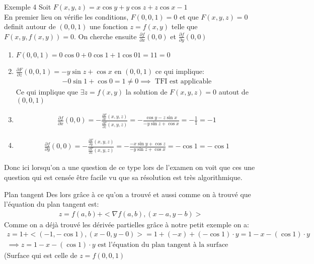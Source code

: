 \begin{parag}{Exemple 4}
    Soit $F\left(x, y, z\right) = x\cos y + y \cos z + z \cos x -1$\\
    En premier lieu on vérifie les conditions, $F\left(0, 0, 1\right) = 0$ et que $F\left(x, y, z\right) = 0$ definit autour de $\left(0, 0, 1\right)$ une fonction $z = f\left(x, y\right)$ telle que $F\left(x, y, f\left(x, y\right)\right) = 0$. On cherche ensuite $\frac{\partial f}{\partial x} \left(0, 0\right)$ et $\frac{\partial f}{\partial y} \left(0, 0\right)$\\
   \begin{enumerate}
       \item $F\left(0, 0, 1\right) = 0 \cos 0 + 0 \cos 1 + 1 \cos 0  1 = 1  1 = 0$
       \item $\frac{\partial F}{\partial z}\left(0, 0, 1\right) = -y\sin z + \cos x$ en $\left(0, 0, 1\right)$ ce qui implique:
           \begin{align*} -0 \sin 1  + \cos 0 =  1 \neq 0 \implies \text{ TFI est applicable} \end{align*}
           Ce qui implique que $\exists z = f\left(x, y\right)$ la solution de $F\left(x, y, z\right) = 0$ autout de $\left(0, 0, 1\right)$
       \item 
       \begin{align*} \frac{\partial f}{\partial x} \left(0, 0\right) = - \frac{\frac{\partial F}{\partial x}\left(x, y, z\right)}{\frac{\partial F}{\partial z}\left(x, y, z\right)} = - \frac{\cos y - z \sin x}{- y\sin z + \cos x} =  -\frac{1}{1} = -1 \end{align*}
   \item 
   \begin{align*} \frac{\partial f}{\partial y}\left(0, 0\right) =  - \frac{\frac{\partial F}{\partial y}\left(x, y, z\right)}{\frac{\partial F}{\partial z}\left(x, y, z\right)} = - \frac{-x\sin y + \cos z}{-y \sin z + \cos x} = -\cos 1 = -\cos 1\end{align*}
   \end{enumerate}
   Donc ici lorsqu'on a une question de ce type lors de l'examen on voit que ces une question  qui est censée être facile vu que sa résolution est très algorithmique.
\end{parag}
\begin{parag}{Plan tangent}
   Des lors grâce à ce qu'on a trouvé et aussi comme on à trouvé que l'équation du plan tangent est:
   \begin{align*} z = f\left(a, b\right) + <\nabla f\left(a, b\right), \left(x - a, y -b\right)> \end{align*}
   Comme on a déjà trouvé les dérivée partielles grâce à notre petit exemple on a:
   \begin{align*} z = 1 + <\left(-1, -\cos 1\right), \left(x-0, y-0\right) > = 1 + \left(-x\right) + \left(-\cos 1\right) \cdot y = 1 -x - \left(\cos 1\right) \cdot  y\\
    \implies z = 1 - x - \left(\cos 1\right) \cdot  y \text{ est l'équation du plan tangent à la surface}
   \end{align*}
   (Surface qui est celle de $z = f\left(0, 0, 1\right)$


\end{parag}
